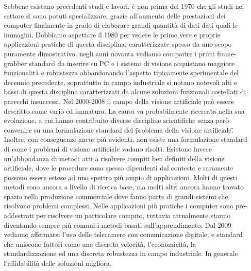 Sebbene esistano precedenti studi e lavori, è non prima del 1970 che gli studi nel settore si sono potuti specializzare, grazie all'aumento delle prestazioni dei computer finalmente in grado di elaborare grandi quantità di dati dati quali le immagini. Dobbiamo aspettare il 1980 per vedere le prime vere e proprie applicazioni pratiche di questa disciplina, caratterizzate spesso da uno scopo puramente dimostrativo. negli anni novanta vediamo comparire i primi frame-grabber standard da inserire su PC e i sistemi di visione acquistano maggiore funzionalità e robustezza abbandonando l'aspetto tipicamente sperimentale del decennio precedente, soprattutto in campo industriale si notano notevoli alti e bassi di questa disciplina caratterizzati da alcune soluzioni funzionali costellati di parecchi insuccessi. Nel 2000-2008 il campo della visione artificiale può essere descritto come vario ed immaturo. La causa va probabilmente ricercata nella sua evoluzione, a cui hanno contribuito diverse discipline scientifiche senza però convenire su una formulazione standard del \"problema della visione artificiale\". Inoltre, con conseguenze ancor più evidenti, non esiste una formulazione standard di come i problemi di visione artificiale vadano risolti. Esistono invece un'abbondanza di metodi atti a risolvere compiti ben definiti della visione artificiale, dove le procedure sono spesso dipendenti dal contesto e raramente possono essere estese ad uno spettro più ampio di applicazioni. Molti di questi metodi sono ancora a livello di ricerca base, ma molti altri ancora hanno trovato spazio nella produzione commerciale dove fanno parte di grandi sistemi che risolvono problemi complessi. Nelle applicazioni più pratiche i computer sono pre-addestrati per risolvere un particolare compito, tuttavia attualmente stanno diventando sempre più comuni i metodi basati sull'apprendimento. Dal 2009 vediamo affermarsi l'uso delle telecamere con comunicazione digitale, e standard che uniscono fattori come una discreta velocità, l'economicità, la standardizzazione ed una discreta robustezza in campo industriale. In generale l'affidabilità delle soluzioni migliora.
\endinput